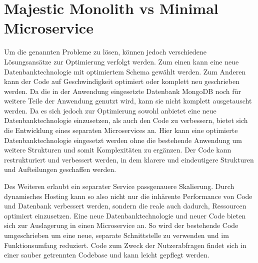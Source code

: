 \section{Majestic Monolith vs Minimal Microservice}
Um die genannten Probleme zu lösen, können jedoch verschiedene Lösungsansätze zur Optimierung verfolgt werden. Zum einen kann eine neue Datenbanktechnologie mit optimiertem Schema gewählt werden. Zum Anderen kann der Code auf Geschwindigkeit optimiert oder komplett neu geschrieben werden.
Da die in der Anwendung eingesetzte Datenbank MongoDB noch für weitere Teile der Anwendung genutzt wird, kann sie nicht komplett ausgetauscht werden. Da es sich jedoch zur Optimierung sowohl anbietet eine neue Datenbanktechnologie einzusetzen, als auch den Code zu verbessern, bietet sich die Entwicklung eines separaten Microservices an. Hier kann eine optimierte Datenbanktechnologie eingesetzt werden ohne die bestehende Anwendung um weitere Strukturen und somit Komplexitäten zu ergänzen. Der Code kann restrukturiert und verbessert werden, in dem klarere und eindeutigere Strukturen und Aufteilungen geschaffen werden.

Des Weiteren erlaubt ein separater Service passgenauere Skalierung. Durch dynamisches Hosting kann so also nicht nur die inhärente Performance von Code und Datenbank verbessert werden, sondern die reale auch dadurch, Ressourcen optimiert einzusetzen.
Eine neue Datenbanktechnologie und neuer Code bieten sich zur Auslagerung in einen Microservice an. So wird der bestehende Code umgeschrieben um eine neue, separate Schnittstelle zu verwenden und im Funktionsumfang reduziert. Code zum Zweck der Nutzerabfragen findet sich in einer sauber getrennten Codebase und kann leicht gepflegt werden.


